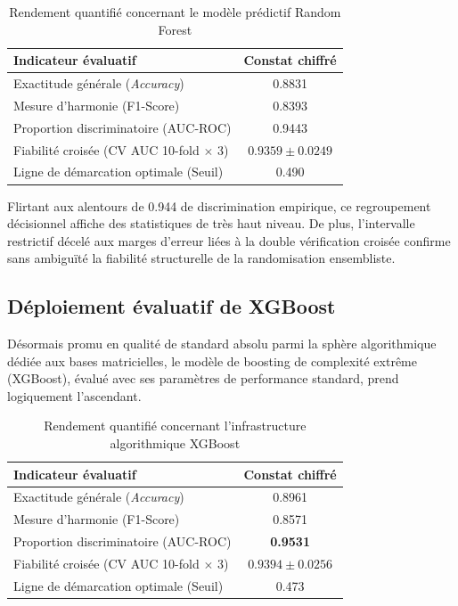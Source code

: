 \begin{table}[htbp]
    \centering
    \caption{Rendement quantifié concernant le modèle prédictif Random Forest}
    \label{tab:rf_results}
    \small
    \begin{tabular}{lc}
        \hline
        \textbf{Indicateur évaluatif} & \textbf{Constat chiffré} \\
        \hline
        Exactitude générale (\textit{Accuracy}) & 0.8831 \\
        Mesure d'harmonie (F1-Score) & 0.8393 \\
        Proportion discriminatoire (AUC-ROC) & 0.9443 \\
        Fiabilité croisée (CV AUC 10-fold $\times$ 3) & $0.9359 \pm 0.0249$ \\
        Ligne de démarcation optimale (Seuil) & 0.490 \\
        \hline
    \end{tabular}
\end{table}

Flirtant aux alentours de 0.944 de discrimination empirique, ce regroupement décisionnel affiche des statistiques de très haut niveau. De plus, l'intervalle restrictif décelé aux marges d'erreur liées à la double vérification croisée confirme sans ambiguïté la fiabilité structurelle de la randomisation ensembliste.

\subsection{Déploiement évaluatif de XGBoost}

Désormais promu en qualité de standard absolu parmi la sphère algorithmique dédiée aux bases matricielles, le modèle de boosting de complexité extrême (XGBoost), évalué avec ses paramètres de performance standard, prend logiquement l'ascendant.

\begin{table}[htbp]
    \centering
    \caption{Rendement quantifié concernant l'infrastructure algorithmique XGBoost}
    \label{tab:xgb_results}
    \small
    \begin{tabular}{lc}
        \hline
        \textbf{Indicateur évaluatif} & \textbf{Constat chiffré} \\
        \hline
        Exactitude générale (\textit{Accuracy}) & 0.8961 \\
        Mesure d'harmonie (F1-Score) & 0.8571 \\
        Proportion discriminatoire (AUC-ROC) & \textbf{0.9531} \\
        Fiabilité croisée (CV AUC 10-fold $\times$ 3) & $0.9394 \pm 0.0256$ \\
        Ligne de démarcation optimale (Seuil) & 0.473 \\
        \hline
    \end{tabular}
\end{table}

